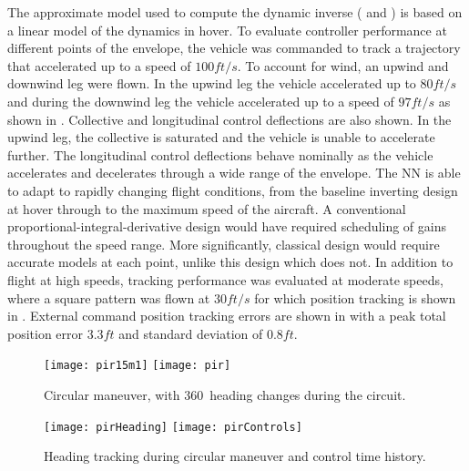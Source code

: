 The approximate model used to compute the dynamic inverse
( and ) is based on a linear
model of the dynamics in hover. To evaluate controller performance
at different points of the envelope, the vehicle was commanded to
track a trajectory that accelerated up to a speed of $100 ft/s$. To
account for wind, an upwind and downwind leg were flown. In the
upwind leg the vehicle accelerated up to $80 ft/s$ and during the
downwind leg the vehicle accelerated up to a speed of $97 ft/s$ as
shown in . Collective and longitudinal control
deflections are also shown. In the upwind leg, the collective is
saturated and the vehicle is unable to accelerate further. The
longitudinal control deflections behave nominally as the vehicle
accelerates and decelerates through a wide range of the envelope.
The NN is able to adapt to rapidly changing flight conditions, from
the baseline inverting design at hover through to the maximum speed
of the aircraft. A conventional proportional-integral-derivative
design would have required scheduling of gains throughout the speed
range. More significantly, classical design would require accurate
models at each point, unlike this design which does not. In addition
to flight at high speeds, tracking performance was evaluated at
moderate speeds, where a square pattern was flown at $30 ft/s$ for
which position tracking is shown in .
External command position tracking errors are shown in
 with a peak total position error $3.3 ft$ and
standard deviation of $0.8 ft$.

\begin{figure}
  \begin{center}
  \texttt{[image: pir15m1]}
  \texttt{[image: pir]}
  \caption{Circular maneuver, with 360\textdegree\ heading changes during the circuit.}
  \label{f:pirPosition}
  \end{center}
\end{figure}

\begin{figure}
  \begin{center}
  \texttt{[image: pirHeading]}
  \texttt{[image: pirControls]}
  \caption{Heading tracking during circular maneuver and control time history.}
  \label{f:pirHeading}
  \end{center}
\end{figure}


